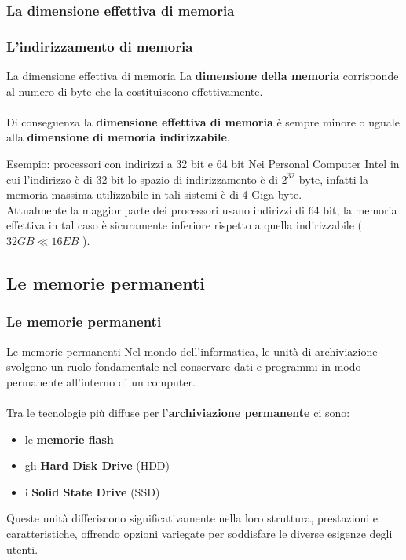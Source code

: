 \subsubsection[La dimensione effettiva di memoria]{La dimensione effettiva di memoria}
\begin{frame}
	\frametitle{L'indirizzamento di memoria}
	
	\begin{block}{La dimensione effettiva di memoria}
		La \textbf{dimensione della memoria} corrisponde al numero di byte che la costituiscono effettivamente.\\~\\
		Di conseguenza la \textbf{dimensione effettiva di memoria} è sempre minore o uguale alla \textbf{dimensione di memoria indirizzabile}.		
	\end{block}
	
	\begin{block}{Esempio: processori con indirizzi a 32 bit e 64 bit}
		Nei Personal Computer Intel in cui l'indirizzo è di 32 bit lo spazio di indirizzamento è di $2^{32}$ byte, infatti la memoria massima utilizzabile in tali sistemi è di 4 Giga byte.\\
		Attualmente la maggior parte dei processori usano indirizzi di 64 bit, la memoria effettiva in tal caso è sicuramente inferiore rispetto a quella indirizzabile ($32GB \ll 16EB$ ).
		
	\end{block}
\end{frame}





\subsection[Le memorie permanenti]{Le memorie permanenti}
\begin{frame}
	\frametitle{Le memorie permanenti}
	  
	\begin{block}{Le memorie permanenti}
		Nel mondo dell'informatica, le unità di archiviazione svolgono un ruolo fondamentale nel conservare dati e programmi in modo permanente all'interno di un computer.\\~\\
		Tra le tecnologie più diffuse per l'\textbf{archiviazione permanente} ci sono:
		\begin{itemize}
			\item le \textbf{memorie flash}
			\item gli \textbf{Hard Disk Drive} (HDD)
			\item i \textbf{Solid State Drive} (SSD)
		\end{itemize}
		Queste unità differiscono significativamente nella loro struttura, prestazioni e caratteristiche, offrendo opzioni variegate per soddisfare le diverse esigenze degli utenti.
	\end{block}

\end{frame}

